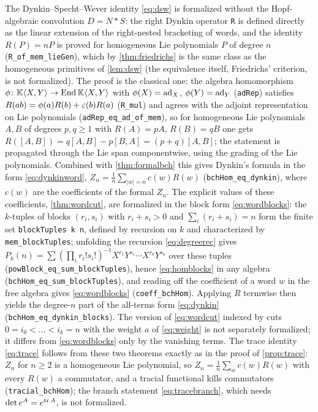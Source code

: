 The Dynkin--Specht--Wever identity \eqref{eq:dsw} is formalized without the
Hopf-algebraic convolution $D=N*S$: the right Dynkin operator \texttt{R} is
defined directly as the linear extension of the right-nested bracketing of
words, and the identity $R(P)=nP$ is proved for homogeneous Lie
polynomials $P$ of degree $n$ (\texttt{R\_of\_mem\_lieGen}), which by
\cref{thm:friedrichs} is the same class as the homogeneous primitives of
\cref{lem:dsw} (the equivalence itself, Friedrichs' criterion, is not
formalized). The proof is the classical one: the algebra
homomorphism $\phi\colon\mathbb{K}\langle X,Y\rangle\to\operatorname{End}\mathbb{K}\langle X,Y\rangle$
with $\phi(X)=\operatorname{ad}_X$, $\phi(Y)=\operatorname{ad}_Y$ (\texttt{adRep}) satisfies
$R(ab)=\phi(a)R(b)+\varepsilon(b)R(a)$ (\texttt{R\_mul}) and agrees with the
adjoint representation on Lie polynomials (\texttt{adRep\_eq\_ad\_of\_mem}),
so for homogeneous Lie polynomials $A,B$ of degrees $p,q\geq1$ with
$R(A)=pA$, $R(B)=qB$ one gets $R([A,B])=q[A,B]-p[B,A]=(p+q)[A,B]$; the
statement is propagated through the Lie span componentwise, using the
grading of the Lie polynomials. Combined with \cref{thm:formalbch} this
gives Dynkin's formula in the form \eqref{eq:dynkinword},
$Z_n=\frac1n\sum_{|w|=n}c(w)R(w)$ (\texttt{bchHom\_eq\_dynkin}), where
$c(w)$ are the coefficients of the formal $Z_n$. The explicit values of
these coefficients, \cref{thm:wordcut}, are formalized in the block form
\eqref{eq:wordblocks}: the $k$-tuples of blocks $(r_i,s_i)$ with
$r_i+s_i>0$ and $\sum_i(r_i+s_i)=n$ form the finite set
\texttt{blockTuples k n}, defined by recursion on $k$ and characterized by
\texttt{mem\_blockTuples}; unfolding the recursion \eqref{eq:degreerec}
gives $P_k(n)=\sum(\prod_ir_i!s_i!)^{-1}X^{r_1}Y^{s_1}\cdots X^{r_k}Y^{s_k}$
over these tuples (\texttt{powBlock\_eq\_sum\_blockTuples}), hence
\eqref{eq:homblocks} in any algebra (\texttt{bchHom\_eq\_sum\_blockTuples}),
and reading off the coefficient of a word $w$ in the free algebra gives
\eqref{eq:wordblocks} (\texttt{coeff\_bchHom}). Applying $R$ termwise then
yields the degree-$n$ part of the all-terms form \eqref{eq:dynkin}
(\texttt{bchHom\_eq\_dynkin\_blocks}). The version of \eqref{eq:wordcut}
indexed by cuts $0=i_0<\dots<i_k=n$ with the weight $a$ of
\eqref{eq:weight} is not separately formalized; it differs from
\eqref{eq:wordblocks} only by the vanishing terms. The trace identity \eqref{eq:trace} follows from these
two theorems exactly as in the proof of \cref{prop:trace}: $Z_n$ for
$n\geq2$ is a homogeneous Lie polynomial, so $Z_n=\frac1n\sum_wc(w)R(w)$
with every $R(w)$ a commutator, and a tracial functional kills commutators
(\texttt{tracial\_bchHom}); the branch statement \eqref{eq:tracebranch},
which needs $\det e^A=e^{\operatorname{tr} A}$, is not formalized.

